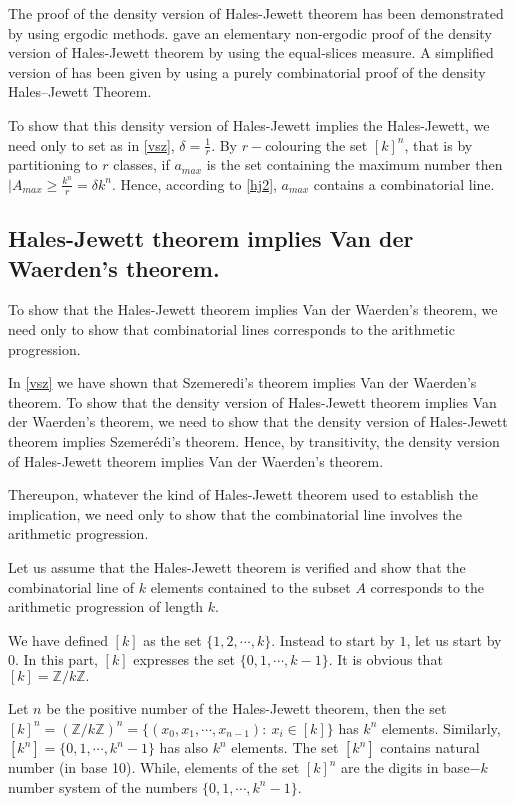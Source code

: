 The proof of the density version of Hales-Jewett theorem has been demonstrated by \cite{furstenberg1991density} using ergodic methods. \cite{Polymath2009new} gave an elementary non-ergodic proof of the density version of Hales-Jewett theorem by using the equal-slices measure. A simplified version of \cite{Polymath2009new} has been given by \cite{dodos2013simple} using  a purely combinatorial proof of the density Hales–Jewett Theorem.

To show that this density version of Hales-Jewett implies the Hales-Jewett, we need only to set as in  \eqref{vsz}, $\delta=\frac{1}{r}.$ By $r-$colouring the set $[k]^n$, that is by partitioning to $r$ classes,  if $a_{max}$ is the set containing the maximum number then $|A_{max} \geq \frac{k^n}{r}=\delta k^n.$ Hence, according to \eqref{hj2}, $a_{max}$ contains a combinatorial line.

\subsection{Hales-Jewett theorem implies Van der Waerden's theorem.}

To show that the Hales-Jewett theorem implies Van der Waerden's theorem, we need only to show that combinatorial lines corresponds to the arithmetic progression.

In \eqref{vsz} we have shown that Szemeredi's theorem implies Van der Waerden's theorem. To show that the density version of Hales-Jewett theorem implies Van der Waerden's theorem, we need to show that the density version of Hales-Jewett theorem implies Szemerédi's theorem. Hence, by transitivity, the density version of Hales-Jewett theorem implies Van der Waerden's theorem. 

Thereupon, whatever the kind of Hales-Jewett theorem used to establish the implication, we need  only to show that the combinatorial line involves the arithmetic progression.

Let us  assume that the Hales-Jewett theorem is verified and show that the combinatorial line of $k$ elements contained to the subset $A$ corresponds to the arithmetic progression of length $k$.

We have defined $[k]$ as the set $\{1,2,\cdots, k\}.$ Instead to start by $1$, let us start by $0.$ In this part, $[k]$ expresses the set $\{0,1,\cdots, k-1\}.$ It is obvious that $[k]=\mathbb{Z}/k\mathbb{Z}.$

Let $n$ be the positive number of the Hales-Jewett theorem, then the set $[k]^n=(\mathbb{Z}/k\mathbb{Z})^n=\{(x_0,x_1, \cdots, x_{n-1}): \ x_i \in [k] \}$ has $k^n$ elements. Similarly, $[k^n]=\{0,1,\cdots, k^n-1\}$ has also $k^n$ elements. The set $[k^n]$ contains natural number (in base 10). While, elements of the set $[k]^n$ are the digits  in base$-k$ number system of the numbers $\{0,1,\cdots,k^n-1\}.$

